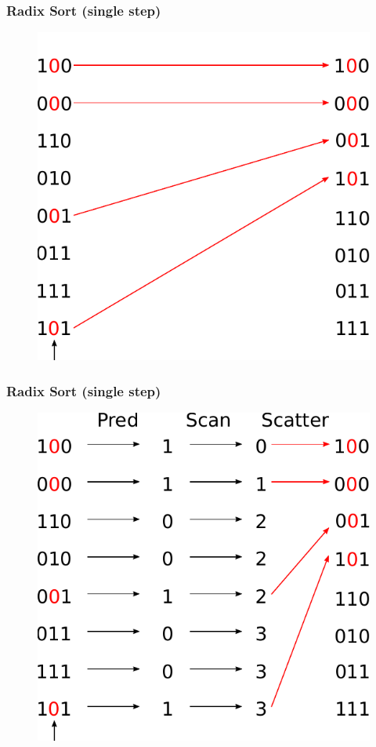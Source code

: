 \documentclass[aspectratio=169,handout]{beamer}
\begin{document}
\frame
{
	\frametitle{Radix Sort (single step)}
	\begin{figure}
		\centering
		\includegraphics[height=0.7\textheight]{radix4}
	\end{figure}
}

\frame
{
	\frametitle{Radix Sort (single step)}
	\begin{figure}
		\centering
		\includegraphics[height=0.7\textheight]{radix5}
	\end{figure}
}
\end{document}
